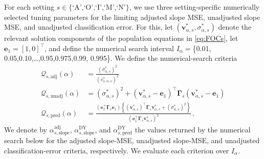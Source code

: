 \documentclass{article}
\theoremstyle{definition}
\newcommand*{\bb}{\boldsymbol}
\def\bv{\bb{v}}
\begin{document}
\begin{bibunit}
For each setting
$s\in\{$`$\mathrm A$',`$\mathrm O$',`$\mathrm I$',`$\mathrm M$',`$\mathrm N$'$\}$,
we use three setting-specific numerically selected tuning parameters for
the limiting adjusted slope MSE, unadjusted slope MSE, and unadjusted
classification error.
For this, let $(\bv_{\alpha,s}^*,\sigma_{\alpha,s}^*)$ denote the relevant solution
components of the population equations in \eqref{eq:FOCs}, let
$\bb e_1=[1,0]^\top$, and define the numerical search interval
$
    I_\alpha=$\{0.01, 0.05,0.10,\ldots,0.95,0.975,0.99, 0.995\}$
$.
We define the numerical-search criteria
$$
\begin{aligned}
    \mathcal Q_{s,\mathrm{adj}}(\alpha)
    &=
    \frac{
        (\sigma_{\alpha,s}^*)^2
    }{
        (v_{1,\alpha,s}^*)^2
    } \\
    \mathcal Q_{s,\mathrm{unadj}}(\alpha)
    &=
        (\sigma_{\alpha,s}^*)^2
        +
        \left(
            \bv_{\alpha,s}^*-\bb e_1
        \right)^\top
        \bb\Gamma_s
        \left(
            \bv_{\alpha,s}^*-\bb e_1
        \right)
    \\
    \mathcal Q_{s,\mathrm{pred}}(\alpha)
    &=
    \frac{
        \left(
            \bb e_1^\top\bb\Gamma_s\bb e_1
        \right)
        \left\{
            (\bv_{\alpha,s}^*)^\top
            \bb\Gamma_s
            \bv_{\alpha,s}^*
            +
            (\sigma_{\alpha,s}^*)^2
        \right\}
    }{
        \left(
            \bb e_1^\top
            \bb\Gamma_s
            \bv_{\alpha,s}^*
        \right)^2
    }\,.
\end{aligned}
$$
We denote by $\alpha_{s,\mathrm{slope}}^{\mathrm{adj}}$,
$\alpha_{s,\mathrm{slope}}^{\mathrm{DY}}$, and
$\alpha_{s,\mathrm{pred}}^{\mathrm{DY}}$ the values returned by the
numerical search below for the adjusted slope-MSE, unadjusted slope-MSE,
and unadjusted classification-error criteria, respectively.
We evaluate each criterion over $I_\alpha$. 


\end{bibunit}
\end{document}
